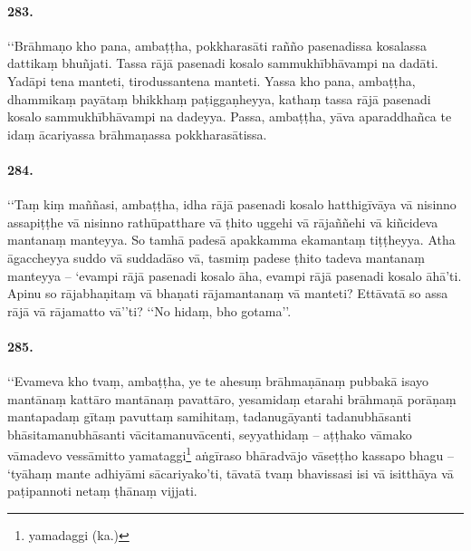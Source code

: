 \paragraph{283.} ‘‘Brāhmaṇo kho pana, ambaṭṭha, pokkharasāti rañño pasenadissa kosalassa dattikaṃ bhuñjati. Tassa rājā pasenadi kosalo sammukhībhāvampi na dadāti. Yadāpi tena manteti, tirodussantena manteti. Yassa kho pana, ambaṭṭha, dhammikaṃ payātaṃ bhikkhaṃ paṭiggaṇheyya, kathaṃ tassa rājā pasenadi kosalo sammukhībhāvampi na dadeyya. Passa, ambaṭṭha, yāva aparaddhañca te idaṃ ācariyassa brāhmaṇassa pokkharasātissa.

\paragraph{284.} ‘‘Taṃ kiṃ maññasi, ambaṭṭha, idha rājā pasenadi kosalo hatthigīvāya vā nisinno assapiṭṭhe vā nisinno rathūpatthare vā ṭhito uggehi vā rājaññehi vā kiñcideva mantanaṃ manteyya. So tamhā padesā apakkamma ekamantaṃ tiṭṭheyya. Atha āgaccheyya suddo vā suddadāso vā, tasmiṃ padese ṭhito tadeva mantanaṃ manteyya – ‘evampi rājā pasenadi kosalo āha, evampi rājā pasenadi kosalo āhā’ti. Apinu so rājabhaṇitaṃ vā bhaṇati rājamantanaṃ vā manteti? Ettāvatā so assa rājā vā rājamatto vā’’ti? ‘‘No hidaṃ, bho gotama’’.

\paragraph{285.} ‘‘Evameva kho tvaṃ, ambaṭṭha, ye te ahesuṃ brāhmaṇānaṃ pubbakā isayo mantānaṃ kattāro mantānaṃ pavattāro, yesamidaṃ etarahi brāhmaṇā porāṇaṃ mantapadaṃ gītaṃ pavuttaṃ samihitaṃ, tadanugāyanti tadanubhāsanti bhāsitamanubhāsanti vācitamanuvācenti, seyyathidaṃ – aṭṭhako vāmako vāmadevo vessāmitto yamataggi\footnote{yamadaggi (ka.)} aṅgīraso bhāradvājo vāseṭṭho kassapo bhagu – ‘tyāhaṃ mante adhiyāmi sācariyako’ti, tāvatā tvaṃ bhavissasi isi vā isitthāya vā paṭipannoti netaṃ ṭhānaṃ vijjati.

